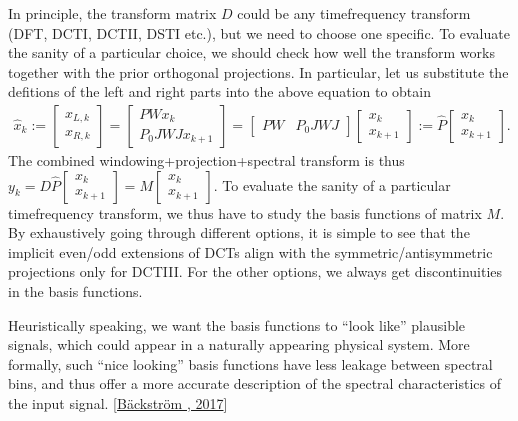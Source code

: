 \documentclass[letterpaper,10pt,english]{jupyterBook}
\begin{document}
\sphinxAtStartPar
In principle, the transform matrix \(D\) could be any time\sphinxhyphen{}frequency
transform (DFT, DCT\sphinxhyphen{}I, DCT\sphinxhyphen{}II, DST\sphinxhyphen{}I etc.), but we need to choose one
specific. To evaluate the sanity of a particular choice, we should check
how well the transform works together with the prior orthogonal
projections. In particular, let us substitute the defitions of the left
and right parts into the above equation to obtain
\begin{equation*}
\begin{split} 
\widehat x_k := \begin{bmatrix}x_{L,k} \\ x_{R,k}
\end{bmatrix} = \begin{bmatrix}PWx_k \\ P_0JWJx_{k+1}
\end{bmatrix} = \begin{bmatrix}PW & P_0JWJ \end{bmatrix}
\begin{bmatrix}x_k \\ x_{k+1} \end{bmatrix} := \hat P
\begin{bmatrix}x_k \\ x_{k+1} \end{bmatrix}. 
\end{split}
\end{equation*}
\sphinxAtStartPar
The combined windowing+projection+spectral transform is thus  
\(y_k=D\hat P \begin{bmatrix}x_k \\ x_{k+1} \end{bmatrix} = M \begin{bmatrix}x_k \\ x_{k+1} \end{bmatrix}. \)
To evaluate the
sanity of a particular time\sphinxhyphen{}frequency transform, we thus have to study
the basis functions of matrix \(M\). By exhaustively going through
different options, it is simple to see that the implicit even/odd
extensions of DCTs align with the symmetric/antisymmetric projections
only for DCT\sphinxhyphen{}III. For the other options, we always get discontinuities
in the basis functions.

\sphinxAtStartPar
Heuristically speaking, we want the basis functions to “look like”
plausible signals, which could appear in a naturally appearing physical
system. More formally, such “nice looking” basis functions have less
leakage between spectral bins, and thus offer a more accurate
description of the spectral characteristics of the input signal.
{[}\hyperlink{cite.Transmission/Modified_discrete_cosine_transform_MDCT:id43}{Bäckström , 2017}{]}
\end{document}
